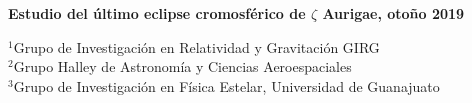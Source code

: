 \documentclass[11pt]{article}
\begin{document}
\begin{titlepage}
\centering \textbf{{\Large {\sc Estudio del último eclipse cromosférico de $\zeta$  Aurigae, otoño 2019}}}

\vfill
{}
\vfill
\hfill


\vfill





\hfill




{{\Large $^1$Grupo de Investigaci\'on en Relatividad y Gravitaci\'on GIRG}} \\
{{\Large$^2$Grupo Halley de Astronom\'ia y Ciencias Aeroespaciales}} \\
{{\Large$^3$Grupo de Investigación en Física Estelar, Universidad de Guanajuato}} \\

\vfill
\vfill



\end{titlepage}


\newpage

\tableofcontents



\newpage




\end{document}
